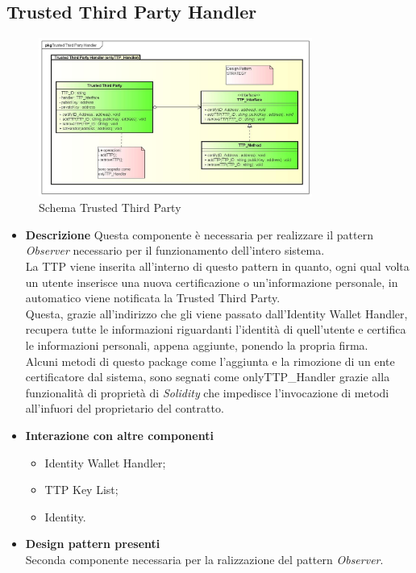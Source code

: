 \subsection{Trusted Third Party Handler}
\begin{figure}[!h]
	\centering
	\includegraphics[width=0.8\textwidth]{immagini/trustedThirdPartyScheme}
	\caption{Schema Trusted Third Party}
\end{figure}
\begin{itemize}
	\item \textbf{Descrizione}
	Questa componente è necessaria per realizzare il pattern \textit{Observer} necessario per il funzionamento dell'intero sistema.\\
	La \gls{TTP} viene inserita all'interno di questo pattern in quanto, ogni qual volta un utente inserisce una nuova certificazione o un'informazione personale, in automatico viene notificata la Trusted Third Party.\\
	Questa, grazie all'indirizzo che gli viene passato dall'Identity Wallet Handler, recupera tutte le informazioni riguardanti l'identità di quell'utente e certifica le informazioni personali, appena aggiunte, ponendo la propria firma.\\
	Alcuni metodi di questo package come l'aggiunta e la rimozione di un ente certificatore dal sistema, sono segnati come onlyTTP\_Handler grazie alla funzionalità di proprietà di \textit{Solidity} che impedisce l'invocazione di metodi all'infuori del proprietario del contratto.
	\item \textbf{Interazione con altre componenti}
	\begin{itemize}
		\item Identity Wallet Handler;
		\item TTP Key List;
		\item Identity.
	\end{itemize}
	\item \textbf{Design pattern presenti}\\
	Seconda componente necessaria per la ralizzazione del pattern \textit{Observer}.
\end{itemize}
